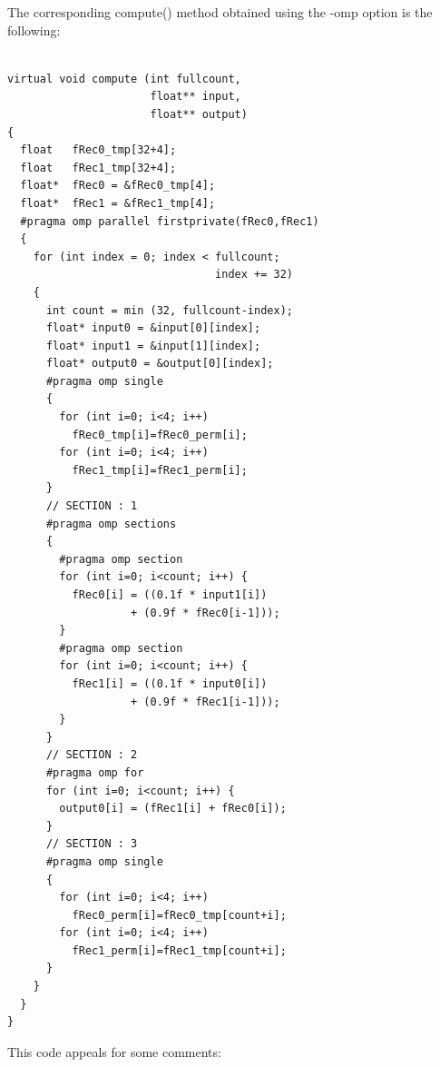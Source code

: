 \documentclass[a4paper,10pt]{book}
\begin{document}
The corresponding compute() method obtained using the -omp option is the following:
\begin{lstlisting}

virtual void compute (int fullcount, 
                      float** input, 
                      float** output) 
{
  float   fRec0_tmp[32+4];
  float   fRec1_tmp[32+4];
  float*  fRec0 = &fRec0_tmp[4];
  float*  fRec1 = &fRec1_tmp[4];
  #pragma omp parallel firstprivate(fRec0,fRec1)
  {
    for (int index = 0; index < fullcount; 
                                index += 32) 
    {
      int count = min (32, fullcount-index);
      float* input0 = &input[0][index];
      float* input1 = &input[1][index];
      float* output0 = &output[0][index];
      #pragma omp single
      {
        for (int i=0; i<4; i++) 
          fRec0_tmp[i]=fRec0_perm[i];
        for (int i=0; i<4; i++) 
          fRec1_tmp[i]=fRec1_perm[i];
      }
      // SECTION : 1
      #pragma omp sections
      {
        #pragma omp section
        for (int i=0; i<count; i++) {
          fRec0[i] = ((0.1f * input1[i]) 
                   + (0.9f * fRec0[i-1]));
        }
        #pragma omp section
        for (int i=0; i<count; i++) {
          fRec1[i] = ((0.1f * input0[i]) 
                   + (0.9f * fRec1[i-1]));
        }
      }
      // SECTION : 2
      #pragma omp for
      for (int i=0; i<count; i++) {
        output0[i] = (fRec1[i] + fRec0[i]);
      }
      // SECTION : 3
      #pragma omp single
      {
        for (int i=0; i<4; i++) 
          fRec0_perm[i]=fRec0_tmp[count+i];
        for (int i=0; i<4; i++) 
          fRec1_perm[i]=fRec1_tmp[count+i];
      }
    }
  }
}

\end{lstlisting}

This code appeals for some comments:
\end{document}
